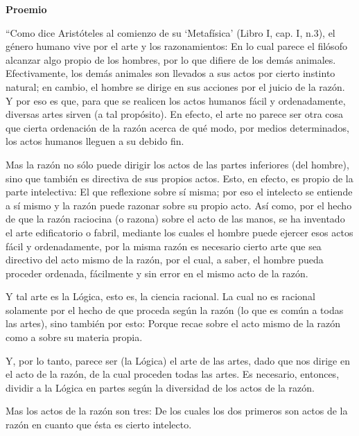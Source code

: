 \documentclass{article}
\begin{document}
    \begin{center}
        \large{\textbf{Proemio}}
    \end{center}
    
    ``Como dice Aristóteles al comienzo de su `Metafísica' (Libro I, cap. I, n.3), el género humano vive por el arte y los razonamientos: En lo cual parece el filósofo alcanzar algo propio de los hombres, por lo que difiere de los demás animales. Efectivamente, los demás animales son llevados a sus actos por cierto instinto natural; en cambio, el hombre se dirige en sus acciones por el juicio de la razón. Y por eso es que, para que se realicen los actos humanos fácil y ordenadamente, diversas artes sirven (a tal propósito). En efecto, el arte no parece ser otra cosa que cierta ordenación de la razón acerca de qué modo, por medios determinados, los actos humanos lleguen a su debido fin. \par
    
    Mas la razón no sólo puede dirigir los actos de las partes inferiores (del hombre), sino que también es directiva de sus propios actos. Esto, en efecto, es propio de la parte intelectiva: El que reflexione sobre sí misma; por eso el intelecto se entiende a sí mismo y la razón puede razonar sobre su propio acto. Así como, por el hecho de que la razón raciocina (o razona) sobre el acto de las manos, se ha inventado el arte edificatorio o fabril, mediante los cuales el hombre puede ejercer esos actos fácil y ordenadamente, por la misma razón es necesario cierto arte que sea directivo del acto mismo de la razón, por el cual, a saber, el hombre pueda proceder ordenada, fácilmente y sin error en el mismo acto de la razón. \par
    
    Y tal arte es la Lógica, esto es, la ciencia racional. La cual no es racional solamente por el hecho de que proceda según la razón (lo que es común a todas las artes), sino también por esto: Porque recae sobre el acto mismo de la razón como a sobre su materia propia. \par
    
    Y, por lo tanto, parece ser (la Lógica) el arte de las artes, dado que nos dirige en el acto de la razón, de la cual proceden todas las artes. Es necesario, entonces, dividir a la Lógica en partes según la diversidad de los actos de la razón. \par
    
    Mas los actos de la razón son tres: De los cuales los dos primeros son actos de la razón en cuanto que ésta es cierto intelecto. \par
    
\end{document}

